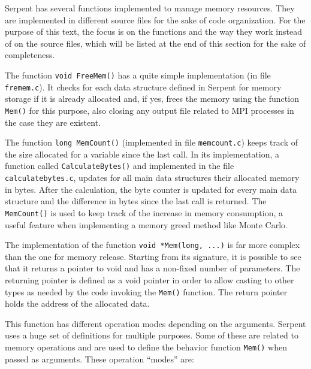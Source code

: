 \documentclass[twoside,a4paper,12pt,english,draft]{anstrans}
\begin{document}
Serpent has several functions implemented to manage memory resources. They are implemented in different
source files for the sake of code organization. For the purpose of this text, the focus is on the functions
and the way they work instead of on the source files, which will be listed at the end of this section for
the sake of completeness.

The function \texttt{void FreeMem()} has a quite simple implementation (in file \texttt{fremem.c}). It checks for each data structure
defined in Serpent for memory storage if it is already allocated and, if yes, frees the memory using
the function \texttt{Mem()} for this purpose, also closing any output file related to MPI processes
in the case they are existent.

The function \texttt{long MemCount()} (implemented in file \texttt{memcount.c}) keeps track
of the size allocated for a variable since the last
call. In its implementation, a function called \texttt{CalculateBytes()} and implemented in the file
\texttt{calculatebytes.c}, updates for all main data structures their allocated memory in bytes.
After the calculation, the byte counter is updated for every main data structure and the difference
in bytes since the last call is returned. The \texttt{MemCount()} is used to keep track of the increase
in memory consumption, a useful feature when implementing a memory greed method like Monte Carlo.

  

The implementation of the function \texttt{void *Mem(long, ...)} is far more complex than the one for
memory release. Starting from its signature, it is possible to see that it returns a pointer to void
and has a non-fixed number of parameters. The returning pointer is defined as a void pointer in order
to allow casting to other types as needed by the code invoking the \texttt{Mem()}
function. The return pointer holds the address of the allocated data.

This function has different operation modes depending on the arguments. Serpent uses a huge set of definitions for
multiple purposes. Some of these are related to memory operations and are used to define the behavior function \texttt{Mem()}
when passed as arguments. These operation ``modes'' are:

\end{document}
